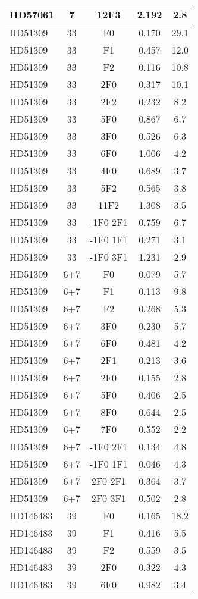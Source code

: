 \begin{table*}
\begin{tabular}{l c c c c}
HD57061 & 7 & 12F3 & 2.192 & 2.8\\ 
\hline
HD51309 & 33 & F0 & 0.170 & 29.1\\ 
HD51309 & 33 & F1 & 0.457 & 12.0\\ 
HD51309 & 33 & F2 & 0.116 & 10.8\\ 
HD51309 & 33 & 2F0 & 0.317 & 10.1\\ 
HD51309 & 33 & 2F2 & 0.232 & 8.2\\ 
HD51309 & 33 & 5F0 & 0.867 & 6.7\\ 
HD51309 & 33 & 3F0 & 0.526 & 6.3\\ 
HD51309 & 33 & 6F0 & 1.006 & 4.2\\ 
HD51309 & 33 & 4F0 & 0.689 & 3.7\\ 
HD51309 & 33 & 5F2 & 0.565 & 3.8\\ 
HD51309 & 33 & 11F2 & 1.308 & 3.5\\ 
HD51309 & 33 & -1F0 2F1 & 0.759 & 6.7\\ 
HD51309 & 33 & -1F0 1F1 & 0.271 & 3.1\\ 
HD51309 & 33 & -1F0 3F1 & 1.231 & 2.9\\ 
\hline
HD51309 & 6+7 & F0 & 0.079 & 5.7\\ 
HD51309 & 6+7 & F1 & 0.113 & 9.8\\ 
HD51309 & 6+7 & F2 & 0.268 & 5.3\\ 
HD51309 & 6+7 & 3F0 & 0.230 & 5.7\\ 
HD51309 & 6+7 & 6F0 & 0.481 & 4.2\\ 
HD51309 & 6+7 & 2F1 & 0.213 & 3.6\\ 
HD51309 & 6+7 & 2F0 & 0.155 & 2.8\\ 
HD51309 & 6+7 & 5F0 & 0.406 & 2.5\\ 
HD51309 & 6+7 & 8F0 & 0.644 & 2.5\\ 
HD51309 & 6+7 & 7F0 & 0.552 & 2.2\\ 
HD51309 & 6+7 & -1F0 2F1 & 0.134 & 4.8\\ 
HD51309 & 6+7 & -1F0 1F1 & 0.046 & 4.3\\ 
HD51309 & 6+7 & 2F0 2F1 & 0.364 & 3.7\\ 
HD51309 & 6+7 & 2F0 3F1 & 0.502 & 2.8\\ 
\hline
HD146483 & 39 & F0 & 0.165 & 18.2\\ 
HD146483 & 39 & F1 & 0.416 & 5.5\\ 
HD146483 & 39 & F2 & 0.559 & 3.5\\ 
HD146483 & 39 & 2F0 & 0.322 & 4.3\\ 
HD146483 & 39 & 6F0 & 0.982 & 3.4\\ 

\end{tabular}
\end{table*}
